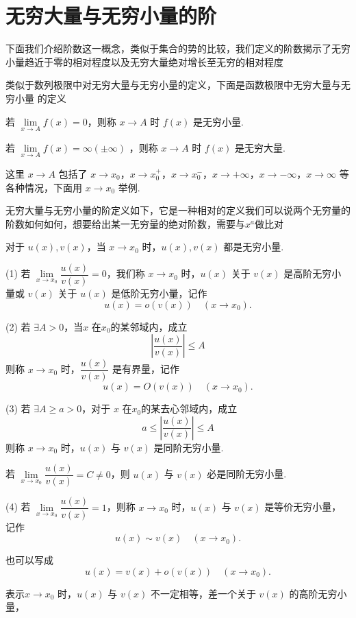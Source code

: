 \section{无穷大量与无穷小量的阶}
下面我们介绍阶数这一概念，类似于集合的势的比较，我们定义的阶数揭示了无穷小量趋近于零的相对程度以及无穷大量绝对增长至无穷的相对程度

类似于数列极限中对无穷大量与无穷小量的定义，下面是函数极限中无穷大量与无穷小量 的定义
\begin{definition}
	若 $\lim\limits_{x \to A} f(x) = 0$，则称 $x \to A$ 时 $f(x)$ 是无穷小量.
	
	若 $\lim\limits_{x \to A} f(x) = \infty(\pm\infty
	)$ ，则称 $x \to A$ 时 $f(x)$ 是无穷大量.
	
	这里 $x \to A$ 包括了 $x \to x_0$，$x \to x_0^+$，$x \to x_0^-$，$x \to +\infty$，$x \to -\infty$，$x \to \infty$ 等各种情况，下面用 $x \to x_0$ 举例.
	
\end{definition}
无穷大量与无穷小量的阶定义如下，它是一种相对的定义我们可以说两个无穷量的阶数如何如何，想要给出某一无穷量的绝对阶数，需要与$x^a$做比对
\begin{definition}
	对于 $u(x), v(x)$，当 $x \to x_0$ 时，$u(x), v(x)$ 都是无穷小量.
	
	(1) 若 $\lim\limits_{x \to x_0} \dfrac{u(x)}{v(x)} = 0$，我们称 $x \to x_0$ 时，$u(x)$ 关于 $v(x)$ 是高阶无穷小量或 $v(x)$ 关于 $u(x)$ 是低阶无穷小量，记作
	\[ u(x) = o(v(x)) \quad (x \to x_0). \]
	
	(2) 若 $\exists A > 0$，当$x$ 在$x_0$的某邻域内，成立
	\[ \left| \frac{u(x)}{v(x)} \right| \leqslant A \]
	则称 $x \to x_0$ 时，$\dfrac{u(x)}{v(x)}$ 是有界量，记作
	\[ u(x) = O(v(x)) \quad (x \to x_0). \]
	
	(3) 若 $\exists A\geqslant a > 0$，对于 $x$ 在$x_0$的某去心邻域内，成立
	\[ a \leqslant \left| \frac{u(x)}{v(x)} \right| \leqslant A \]
	则称 $x \to x_0$ 时，$u(x)$ 与 $v(x)$ 是同阶无穷小量.
	
	若 $\lim\limits_{x \to x_0} \dfrac{u(x)}{v(x)} = C \neq 0$，则 $u(x)$ 与 $v(x)$ 必是同阶无穷小量.
	
	(4) 若 $\lim\limits_{x \to x_0} \dfrac{u(x)}{v(x)} = 1$，则称 $x \to x_0$ 时，$u(x)$ 与 $v(x)$ 是等价无穷小量，记作
	\[ u(x) \sim v(x) \quad (x \to x_0). \]
	
	也可以写成
	\[ u(x) = v(x) + o(v(x)) \quad (x \to x_0). \]
	
	表示$x \to x_0$ 时，$u(x)$ 与 $v(x)$ 不一定相等，差一个关于 $v(x)$ 的高阶无穷小量，
	
\end{definition}
